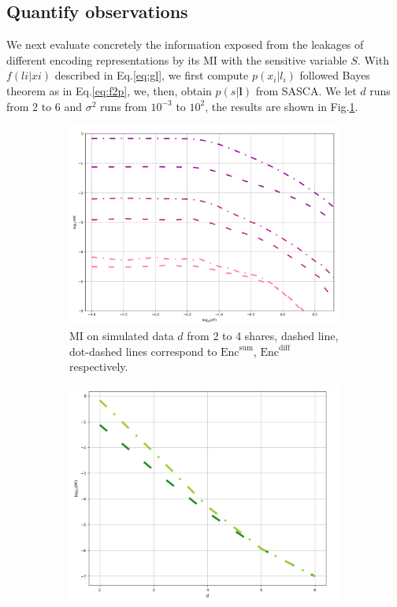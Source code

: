 \documentclass{llncs}
\begin{document}
\subsection{Quantify observations}
We next evaluate concretely the information exposed from the leakages of different encoding representations by its MI with the sensitive variable $S$. With $f(li|xi)$ described in Eq.\ref{eq:gl}, we first compute $p(x_i|l_i)$ followed Bayes theorem as in Eq.\ref{eq:f2p}, we, then, obtain $p(s|\bm{l})$ from SASCA. We let $d$ runs from 2 to 6 and $\sigma^2$ runs from $10^{-3}$ to $10^2$, the results are shown in Fig.\ref{fig:mi234}.
\begin{figure}[h]
	
	\begin{subfigure}{0.5\textwidth}
		\includegraphics[scale=0.14]{figures/mi_234.png} 
		\caption{MI on simulated data $d$ from  2 to 4 shares, dashed line, dot-dashed lines correspond to $\text{Enc}^{\text{sum}}$, $\text{Enc}^{\text{diff}}$ respectively.}\label{fig:mi234}
	\end{subfigure}
	\begin{subfigure}{0.5\textwidth}
	\includegraphics[scale=0.16]{figures/mi_lines_modes.png} 

\end{subfigure}
\end{figure}
\end{document}

